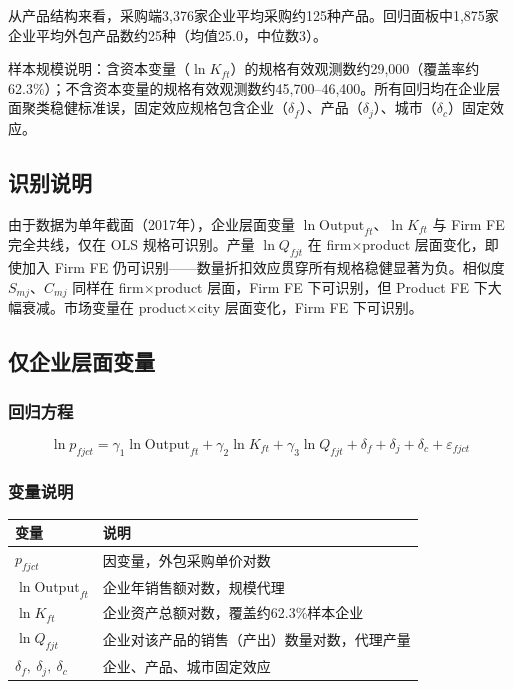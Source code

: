 \documentclass[12pt]{article}
\begin{document}
从产品结构来看，采购端3,376家企业平均采购约125种产品。回归面板中1,875家企业平均外包产品数约25种（均值25.0，中位数3）。

样本规模说明：含资本变量（$\ln K_{ft}$）的规格有效观测数约29,000（覆盖率约62.3\%）；不含资本变量的规格有效观测数约45,700–46,400。所有回归均在企业层面聚类稳健标准误，固定效应规格包含企业（$\delta_f$）、产品（$\delta_j$）、城市（$\delta_c$）固定效应。

\subsection*{识别说明}

由于数据为单年截面（2017年），企业层面变量 $\ln\mathrm{Output}_{ft}$、$\ln K_{ft}$ 与 Firm FE 完全共线，仅在 OLS 规格可识别。产量 $\ln Q_{fjt}$ 在 firm$\times$product 层面变化，即使加入 Firm FE 仍可识别——数量折扣效应贯穿所有规格稳健显著为负。相似度 $S_{mj}$、$C_{mj}$ 同样在 firm$\times$product 层面，Firm FE 下可识别，但 Product FE 下大幅衰减。市场变量在 product$\times$city 层面变化，Firm FE 下可识别。

\subsection{仅企业层面变量}

\subsubsection*{回归方程}

\begin{equation}
  \ln p_{fjct} = \gamma_1 \ln\mathrm{Output}_{ft} + \gamma_2 \ln K_{ft}
    + \gamma_3 \ln Q_{fjt}
    + \delta_f + \delta_j + \delta_c + \varepsilon_{fjct}
\end{equation}

\subsubsection*{变量说明}

\begin{table}[H]
  \centering\small
  \begin{tabular}{L{3.5cm} L{10cm}}
    \toprule
    变量 & 说明 \\
    \midrule
    $p_{fjct}$ & 因变量，外包采购单价对数 \\[3pt]
    $\ln\mathrm{Output}_{ft}$ & 企业年销售额对数，规模代理 \\[3pt]
    $\ln K_{ft}$ & 企业资产总额对数，覆盖约62.3\%样本企业 \\[3pt]
    $\ln Q_{fjt}$ & 企业对该产品的销售（产出）数量对数，代理产量 \\[3pt]
    $\delta_f,\ \delta_j,\ \delta_c$ & 企业、产品、城市固定效应 \\
    \bottomrule
  \end{tabular}
\end{table}
\end{document}
